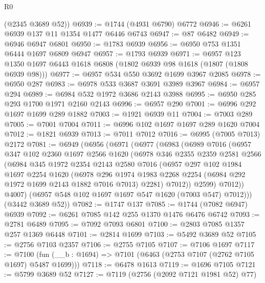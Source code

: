 \begin{lexlean}{R0}
\begin{coremodule}
      (@2345 @3689 @52))
@6939 := @1744 (@4931 @6790) @6772
@6946 := @6261 @6939 @137 @11 @1354 @1477 @6446 @6743
@6947 := @87 @6482
@6949 := @6946 @6947 @6801
@6950 := @1783 @6939
@6956 := @6950 @753 @1351 @6444 @1697 @6809 @6947
@6957 := @1793 @6939
@6971 := @6957 @123 @1350 @1697 @6443 @1618 @6808 (@1802 @6939 @98 @1618 (@1807 (@1808 @6939 @98)))
@6977 := @6957 @534 @550 @3692 @1699 @3967 @2085
@6978 := @6950 @287
@6983 := @6978 @533 @3687 @3691 @3989 @3967
@6984 := @6957 @294
@6989 := @6984 @532 @1972 @3686 @2143 @3988
@6995 := @6950 @285 @293 @1700 @1971 @2160 @2143
@6996 := @6957 @290
@7001 := @6996 @292 @1697 @1699 @289 @1882
@7003 := @1921 @6939 @11
@7004 := @7003 @289
@7005 := @7001 @7004
@7011 := @6996 @102 @1697 @1697 @289 @1620 @7004
@7012 := @1821 @6939
@7013 := @7011 @7012
@7016 := @6995 (@7005 @7013) @2172
@7081 := @6949
    (@6956
      (@6971
        (@6977
          (@6983
            (@6989
              @7016
              (@6957
                @347
                @102
                @2360
                @1697
                @2566
                @1620
                (@6978
                  @346
                  @2355
                  @2359
                  @2581
                  @2566
                  (@6984
                    @345
                    @1972
                    @2354
                    @2143
                    @2580
                    @7016
                    (@6957
                      @297
                      @102
                      @1984
                      @1697
                      @2254
                      @1620
                      (@6978
                        @296
                        @1974
                        @1983
                        @2268
                        @2254
                        (@6984 @292 @1972 @1699 @2143 @1882 @7016 @7013)
                        @2281)
                      @7012))
                  @2599)
                @7012))
            @4007)
          (@6957 @548 @102 @1697 @1697 @547 @1620 (@7003 @547) @7012)))
      (@3442 @3689 @52))
@7082 := @1747 @137
@7085 := @1744 (@7082 @6947) @6939
@7092 := @6261 @7085 @142 @255 @1370 @1476 @6476 @6742
@7093 := @2781 @6489
@7095 := @7092 @7093 @6801
@7100 := @2803 @7085 @1357 @257 @1369 @6448
@7101 := @2814 @1699
@7103 := @5492 @3689 @52
@7105 := @2756 @7103 @2357
@7106 := @2755 @7105
@7107 := @7106 @1697
@7117 := @7100 (fun (__b : @1694) => @7101 (@6463 (@2753 @7107 (@2762 @7105 @1697) @5487 @1699)))
@7118 := @6478 @1613
@7119 := @1696 @7105
@7121 := @5799 @3689 @52
@7127 := @7119 (@2756 (@2092 @7121 @1981 @52) @77)

\end{coremodule}
\end{lexlean}
